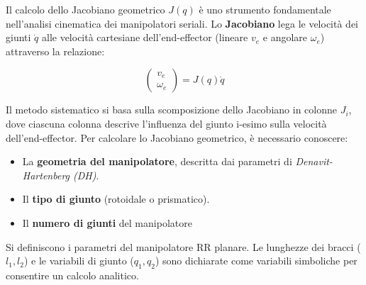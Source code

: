 \documentclass[11pt, a4paper]{article}
\begin{document}
\label{T_82ff}

\begin{par}
\begin{flushleft}
Il calcolo dello Jacobiano geometrico $J(q)$ è uno strumento fondamentale nell'analisi cinematica dei manipolatori seriali. Lo \textbf{Jacobiano} lega le velocità dei giunti $\dot{q}$ alle velocità cartesiane dell'end-effector (lineare $v_e$ e angolare $\omega_e$) attraverso la relazione:
\end{flushleft}
\end{par}

\label{H_91e8}
\[
    \left(\begin{array}{c}
    v_e \\
    \omega_e
    \end{array}\right)=J(q)\dot{q}
\]

\begin{par}
\begin{flushleft}
Il metodo sistematico si basa sulla scomposizione dello Jacobiano in colonne $J_i$, dove ciascuna colonna descrive l'influenza del giunto i-esimo sulla velocità dell'end-effector. Per calcolare lo Jacobiano geometrico, è necessario conoscere:
\end{flushleft}
\end{par}

\begin{itemize}
\setlength{\itemsep}{-1ex}
   \item{\begin{flushleft} La \textbf{geometria del manipolatore}, descritta dai parametri di \textit{Denavit-Hartenberg (DH)}. \end{flushleft}}
   \item{\begin{flushleft} Il \textbf{tipo di giunto} (rotoidale o prismatico). \end{flushleft}}
   \item{\begin{flushleft} Il \textbf{numero di giunti }del manipolatore \end{flushleft}}
\end{itemize}

\begin{par}
\begin{flushleft}
Si definiscono i parametri del manipolatore RR planare. Le lunghezze dei bracci ($l_1 ,l_2$) e le variabili di giunto ($q_1 ,q_2$) sono dichiarate come variabili simboliche per consentire un calcolo analitico.
\end{flushleft}
\end{par}
\end{document}
